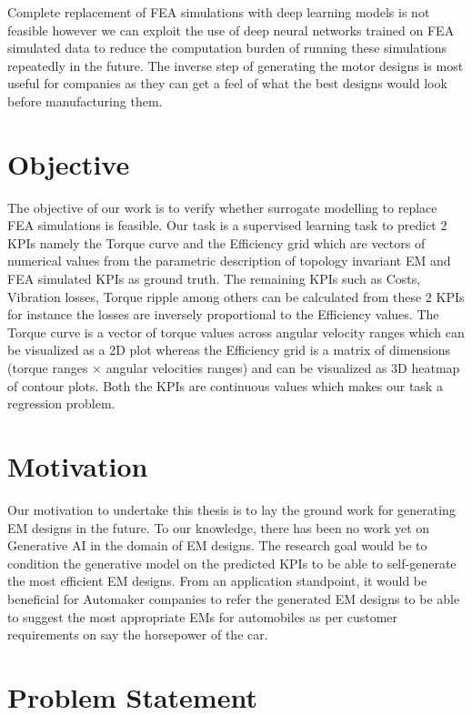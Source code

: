 \documentclass{report} %
\begin{document}
Complete replacement of \ac{FEA} simulations with deep learning models is not feasible however we can exploit the use of deep neural networks 
trained on \ac{FEA} simulated data to reduce the computation burden of running these simulations repeatedly in the future.
The inverse step of generating the motor designs is most useful for companies as they can get a feel of what the best designs would look before manufacturing them.

\section{Objective}\label{sec:Objective}
The objective of our work is to verify whether surrogate modelling to replace \ac{FEA} simulations is feasible.
Our task is a supervised learning task to predict 2 KPIs namely the Torque curve and the Efficiency grid which are vectors of numerical values  
from the parametric description of topology invariant \ac{EM} and \ac{FEA} simulated KPIs as ground truth. 
The remaining \ac{KPI}s such as Costs, Vibration losses, Torque ripple among others can be calculated from these 2 \ac{KPI}s for instance the losses are inversely proportional to the Efficiency values.
The Torque curve is a vector of torque values across angular velocity ranges which can be visualized as a 2\ac{D} plot whereas the Efficiency grid is a matrix of 
dimensions (torque ranges $\times$ angular velocities ranges) and can be visualized as 3\ac{D} heatmap of contour plots. 
Both the \ac{KPI}s are continuous values which makes our task a regression problem. 

\section{Motivation}\label{sec:Motivation}
Our motivation to undertake this thesis is to lay the ground work for generating \ac{EM} designs in the future. To our knowledge, there has been no work yet on Generative 
AI in the domain of \ac{EM} designs. The research goal would be to condition the generative model on the predicted \ac{KPI}s to be able to self-generate the most efficient \ac{EM} 
designs. From an application standpoint, it would be beneficial for Automaker companies to refer the generated \ac{EM} designs to be able to suggest the most appropriate \ac{EM}s 
for automobiles as per customer requirements on say the horsepower of the car.

\section{Problem Statement}\label{sec:Problem Statement}
\end{document}
